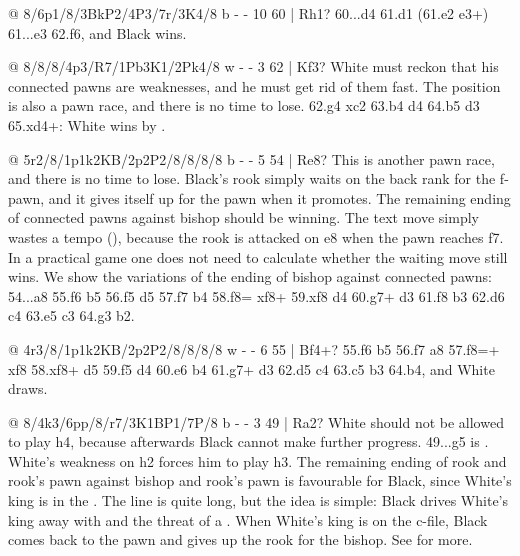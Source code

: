 @ 8/6p1/8/3BkP2/4P3/7r/3K4/8 b - - 10 60 | Rh1?
60...\K d4 61.\K d1 (61.\K e2 \R e3+) 61...\R e3 62.f6, and Black wins.

@ 8/8/8/4p3/R7/1Pb3K1/2Pk4/8 w - - 3 62 | Kf3?
White must reckon that his connected pawns are weaknesses, and he must get rid of them fast. The
position is also a pawn race, and there is no time to lose.
62.\R g4 \K xc2 63.b4 \B d4 64.b5 \K d3 65.\R xd4+: White wins by .

@ 5r2/8/1p1k2KB/2p2P2/8/8/8/8 b - - 5 54 | Re8?
This is another pawn race, and there is no time to lose.
Black's rook simply waits on the back rank for the f-pawn, and it gives itself up for the pawn
when it promotes. The remaining ending of connected pawns against bishop should be winning. The
text move simply wastes a tempo (), because the rook is attacked on e8
when the pawn reaches f7. In a practical game one does not need to calculate whether the waiting
move still wins. We show the variations of the ending of bishop against connected pawns:
54...\R a8 55.f6 b5 56.\K f5 \K d5 57.f7 b4 58.f8=\Q{} \R xf8+ 59.\B xf8 \K d4 60.\B g7+ \K d3
61.\B f8 b3 62.\B d6 c4 63.\B e5 c3 64.\B g3 b2.

@ 4r3/8/1p1k2KB/2p2P2/8/8/8/8 w - - 6 55 | Bf4+?
55.f6 b5 56.f7 \R a8 57.f8=\Q+ \R xf8 58.\B xf8+ \K d5 59.\K f5 \K d4 60.\K e6 b4 61.\B g7+ \K d3
62.\K d5 c4 63.\K c5 b3 64.\K b4, and White draws.

@ 8/4k3/6pp/8/r7/3K1BP1/7P/8 b - - 3 49 | Ra2?
White should not be allowed to play h4, because afterwards Black cannot make further progress.
49...g5 is . White's weakness on h2 forces him to play
h3. The remaining ending of rook and rook's pawn against bishop and rook's pawn is favourable for
Black, since White's king is in the
. The line is quite long, but the idea is
simple: Black drives White's king away with  and the threat of a
. When White's king is  on the
c-file, Black comes back to the pawn and gives up the rook for the bishop.
See \cite{Dvoretsky:2008-endgame-manual} for more.

